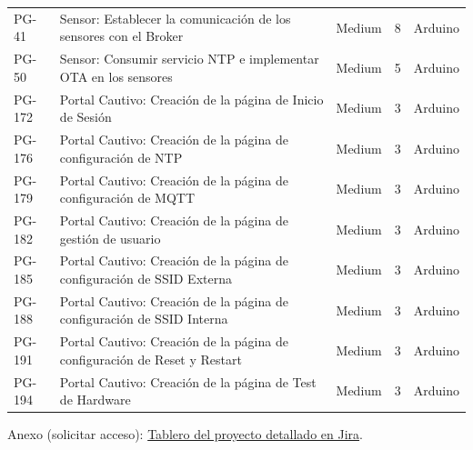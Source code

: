 \documentclass[11pt]{charter}
\begin{document}
\begin{tabularx}{\linewidth}{@{}p{1.3cm} p{14cm} p{1.7cm} p{1.5cm} p{2.5cm}@{}}
PG-41  & Sensor: Establecer la comunicación de los sensores con el Broker                                       & Medium    & 8                          & Arduino               \\
PG-50  & Sensor: Consumir servicio NTP e implementar OTA en los sensores                                        & Medium    & 5                          & Arduino               \\
PG-172 & Portal Cautivo: Creación de la página de Inicio de Sesión                                              & Medium    & 3                          & Arduino               \\
PG-176 & Portal Cautivo: Creación de la página de configuración de NTP                                          & Medium    & 3                          & Arduino               \\
PG-179 & Portal Cautivo: Creación de la página de configuración de MQTT                                         & Medium    & 3                          & Arduino               \\
PG-182 & Portal Cautivo: Creación de la página de gestión de usuario                                            & Medium    & 3                          & Arduino               \\
PG-185 & Portal Cautivo: Creación de la página de configuración de SSID Externa                                 & Medium    & 3                          & Arduino               \\
PG-188 & Portal Cautivo: Creación de la página de configuración de SSID Interna                                 & Medium    & 3                          & Arduino               \\
PG-191 & Portal Cautivo: Creación de la página de configuración de Reset y Restart                              & Medium    & 3                          & Arduino               \\
PG-194 & Portal Cautivo: Creación de la página de Test de Hardware                                              & Medium    & 3                          & Arduino   
\end{tabularx}

Anexo (solicitar acceso): \href{https://kathemica.atlassian.net/secure/RapidBoard.jspa?rapidView=1&projectKey=PG&view=planning&selectedIssue=PG-41&issueLimit=100&atlOrigin=eyJpIjoiNzljYTRhZmNiZDZmNDE2YTlhMTcxM2Q0ZDJkZjQ3OTciLCJwIjoiaiJ9}{Tablero del proyecto detallado en Jira}.


\clearpage
\end{document}
